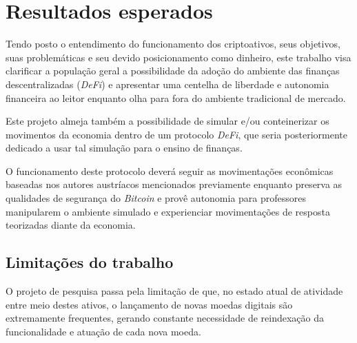 \chapter{Resultados esperados}

Tendo posto o entendimento do funcionamento dos criptoativos, seus objetivos, suas problemáticas e seu devido posicionamento como dinheiro, este trabalho visa clarificar a população geral a possibilidade da adoção do ambiente das finanças descentralizadas (\textit{DeFi}) e apresentar uma centelha de liberdade e autonomia financeira ao leitor enquanto olha para fora do ambiente tradicional de mercado.

Este projeto almeja também a possibilidade de simular e/ou conteinerizar os movimentos da economia dentro de um protocolo \textit{DeFi}, que seria posteriormente dedicado a usar tal simulação para o ensino de finanças.

O funcionamento deste protocolo deverá seguir as movimentações econômicas baseadas nos autores austríacos mencionados previamente enquanto preserva as qualidades de segurança do \textit{Bitcoin} e provê autonomia para professores manipularem o ambiente simulado e experienciar movimentações de resposta teorizadas diante da economia.

\section{Limitações do trabalho}

O projeto de pesquisa passa pela limitação de que, no estado atual de atividade entre meio destes ativos, o lançamento de novas moedas digitais são extremamente frequentes, gerando constante necessidade de reindexação da funcionalidade e atuação de cada nova moeda.

